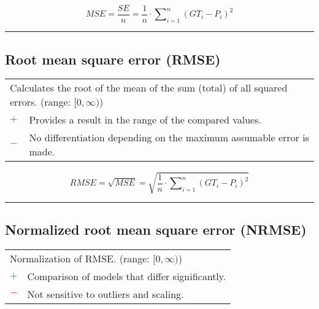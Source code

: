 \documentclass{article}
\begin{document}
\begin{equation}
	\textit{MSE} = \dfrac{\textit{SE}}{n} = \dfrac{1}{n} \cdot \sum\nolimits_{i = 1}^n (\textit{GT}_i - P_i)^2
%
	\label{equation:MSE}
\end{equation}

\hrule


\subsection[Root mean square error (RMSE)]{Root mean square error (RMSE) \cite{willmott2005advantages, hyndman2006another, pontius2008components}}

\begin{table}[H]\centering
	\begin{tabular}{m{}m{}}
		\multicolumn{2}{m{0.95\textwidth}}{Calculates the root of the mean of the sum (total) of all squared errors. (range: $[0, \infty)$)} \\
		\textcolor{Green}{$+$} & Provides a result in the range of the compared values. \\
		\textcolor{Red}{$-$}   & No differentiation depending on the maximum assumable error is made.
	\end{tabular}
\end{table}

\begin{equation}
	\textit{RMSE} = \sqrt{\textit{MSE}} = \sqrt{\dfrac{1}{n} \cdot \sum\nolimits_{i = 1}^n (\textit{GT}_i - P_i)^2}
%
	\label{equation:RMSE}
\end{equation}

\hrule


\subsection[Normalized root mean square error (NRMSE)]{Normalized root mean square error (NRMSE) \cite{chang2004air, kim2005missing}}

\begin{table}[H]\centering
	\begin{tabular}{m{}m{}}
		\multicolumn{2}{m{0.95\textwidth}}{Normalization of RMSE. (range: $[0, \infty)$)} \\
		\textcolor{Green}{$+$} & Comparison of models that differ significantly. \\
		\textcolor{Red}{$-$}   & Not sensitive to outliers and scaling.
	\end{tabular}
\end{table}
\end{document}
